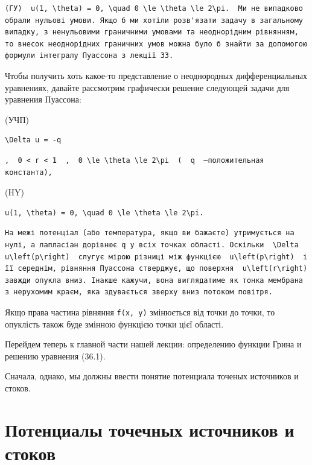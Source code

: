 \documentclass[
  ukrainian,
]{article}
\begin{document}
\begin{verbatim}
(ГУ)  u(1, \theta) = 0, \quad 0 \le \theta \le 2\pi.  Ми не випадково обрали нульові умови. Якщо б ми хотіли розв'язати задачу в загальному випадку, з ненульовими граничними умовами та неоднорідним рівнянням, то внесок неоднорідних граничних умов можна було б знайти за допомогою формули інтегралу Пуассона з лекції 33.
\end{verbatim}

Чтобы получить хоть какое-то представление о неоднородных
дифференциальных уравнениях, давайте рассмотрим графически решение
следующей задачи для уравнения Пуассона:

(УЧП)

\begin{verbatim}
\Delta u = -q
\end{verbatim}

\begin{verbatim}
,  0 < r < 1  ,  0 \le \theta \le 2\pi  (  q  —положительная константа),
\end{verbatim}

(HY)

\begin{verbatim}
u(1, \theta) = 0, \quad 0 \le \theta \le 2\pi.
\end{verbatim}

\begin{verbatim}
На межі потенціал (або температура, якщо ви бажаєте) утримується на нулі, а лапласіан дорівнює q у всіх точках області. Оскільки  \Delta u\left(p\right)  слугує мірою різниці між функцією  u\left(p\right)  і її середнім, рівняння Пуассона стверджує, що поверхня  u\left(r\right)  завжди опукла вниз. Інакше кажучи, вона виглядатиме як тонка мембрана з нерухомим краєм, яка здувається зверху вниз потоком повітря.
\end{verbatim}

Якщо права частина рівняння \texttt{f(x,\ y)} змінюється від точки до
точки, то опуклість також буде змінною функцією точки цієї області.

Перейдем теперь к главной части нашей лекции: определению функции Грина
и решению уравнения (36.1).

Сначала, однако, мы должны ввести понятие потенциала точеных источников
и стоков.

\section{Потенциалы точечных источников и
стоков}\label{ux43fux43eux442ux435ux43dux446ux438ux430ux43bux44b-ux442ux43eux447ux435ux447ux43dux44bux445-ux438ux441ux442ux43eux447ux43dux438ux43aux43eux432-ux438-ux441ux442ux43eux43aux43eux432}
\end{document}
